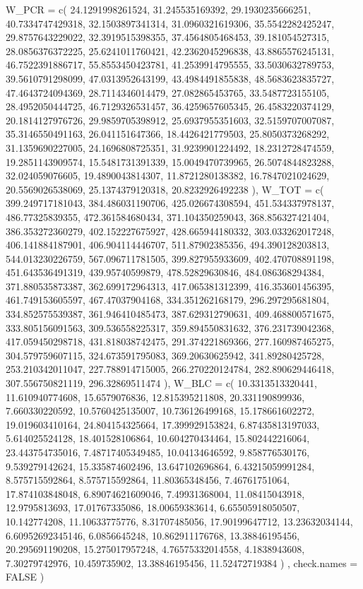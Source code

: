 \documentclass[
  letterpaper,
  DIV=11]{scrartcl}
\newenvironment{Shaded}{\begin{snugshade}}{\end{snugshade}}
\newcommand{\NormalTok}[1]{\textcolor[rgb]{0.00,0.23,0.31}{#1}}
\begin{document}
\begin{Shaded}
\begin{Highlighting}[]
\NormalTok{  \textasciigrave{}W\_PCR\textasciigrave{} = c( 24.1291998261524, 31.245535169392, 29.1930235666251, 40.7334747429318, 32.1503897341314, 31.0960321619306, 35.5542282425247, 29.8757643229022, 32.3919515398355, 37.4564805468453, 39.181054527315, 28.0856376372225, 25.6241011760421, 42.2362045296838, 43.8865576245131, 46.7522391886717, 55.8553450423781, 41.2539914795555, 33.5030632789753, 39.5610791298099, 47.0313952643199, 43.4984491855838, 48.5683623835727, 47.4643724094369, 28.7114346014479, 27.082865453765, 33.5487723155105, 28.4952050444725, 46.7129326531457, 36.4259657605345, 26.4583220374129, 20.1814127976726, 29.9859705398912, 25.6937955351603, 32.5159707007087, 35.3146550491163, 26.041151647366, 18.4426421779503, 25.8050373268292, 31.1359690227005, 24.1696808725351, 31.9239901224492, 18.2312728474559, 19.2851143909574, 15.5481731391339, 15.0049470739965, 26.5074844823288, 32.024059076605, 19.4890043814307, 11.8721280138382, 16.7847021024629, 20.5569026538069, 25.1374379120318, 20.8232926492238 ),}
\NormalTok{  \textasciigrave{}W\_TOT\textasciigrave{} = c( 399.249717181043, 384.486031190706, 425.026674308594, 451.534337978137, 486.77325839355, 472.361584680434, 371.104350259043, 368.856327421404, 386.353272360279, 402.152227675927, 428.665944180332, 303.033262017248, 406.141884187901, 406.904114446707, 511.87902385356, 494.390128203813, 544.013230226759, 567.096711781505, 399.827955933609, 402.470708891198, 451.643536491319, 439.95740599879, 478.52829630846, 484.086368294384, 371.880535873387, 362.699172964313, 417.065381312399, 416.353601456395, 461.749153605597, 467.47037904168, 334.351262168179, 296.297295681804, 334.852575539387, 361.946410485473, 387.629312790631, 409.468800571675, 333.805156091563, 309.536558225317, 359.894550831632, 376.231739042368, 417.059450298718, 431.818038742475, 291.374221869366, 277.160987465275, 304.579759607115, 324.673591795083, 369.20630625942, 341.89280425728, 253.210342011047, 227.788914715005, 266.270220124784, 282.890629446418, 307.556750821119, 296.32869511474 ),}
\NormalTok{  \textasciigrave{}W\_BLC\textasciigrave{} = c( 10.3313513320441, 11.610940774608, 15.6579076836, 12.815395211808, 20.331190899936, 7.660330220592, 10.5760425135007, 10.736126499168, 15.178661602272, 19.019603410164, 24.804154325664, 17.399929153824, 6.87435813197033, 5.614025524128, 18.401528106864, 10.604270434464, 15.802442216064, 23.443754735016, 7.48717405349485, 10.04134646592, 9.858776530176, 9.539279142624, 15.335874602496, 13.647102696864, 6.43215059991284, 8.575715592864, 8.575715592864, 11.80365348456, 7.46761751064, 17.874103848048, 6.89074621609046, 7.49931368004, 11.08415043918, 12.9795813693, 17.01767335086, 18.00659383614, 6.65505918050507, 10.142774208, 11.10633775776, 8.31707485056, 17.90199647712, 13.23632034144, 6.60952692345146, 6.0856645248, 10.862911176768, 13.38846195456, 20.295691190208, 15.275017957248, 4.76575332014558, 4.1838943608, 7.30279742976, 10.459735902, 13.38846195456, 11.52472719384 )}
\NormalTok{  , check.names = FALSE}
\NormalTok{)}


\end{Highlighting}
\end{Shaded}
\end{document}
